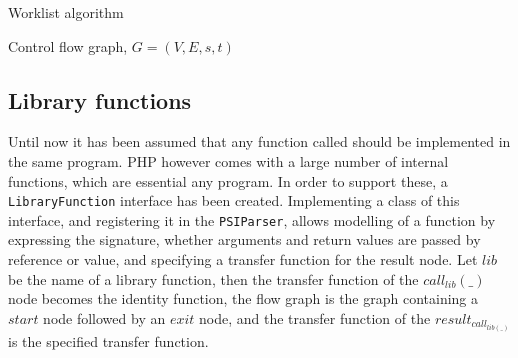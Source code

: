 \begin{algorithm}
\caption{Worklist algorithm}
\label{algo:worklist}
\begin{algorithmic}[1]
\scriptsize
\Require Control flow graph, $G=(V,E,s,t)$
	
		
		
	\EndIf
	
\EndWhile
\end{algorithmic}
\end{algorithm}

\subsection{Library functions}

Until now it has been assumed that any function called should be implemented in the same program. PHP however comes with a large number of internal functions, which are essential any program. In order to support these, a \texttt{LibraryFunction} interface has been created. Implementing a class of this interface, and registering it in the \texttt{PSIParser}, allows modelling of a function by expressing the signature, whether arguments and return values are passed by reference or value, and specifying a transfer function for the result node. Let $\mathit{lib}$ be the name of a library function, then the transfer function of the $\mathit{call}_\mathit{lib}(\_)$ node becomes the identity function, the flow graph is the graph containing a $\mathit{start}$ node followed by an $\mathit{exit}$ node, and the transfer function of the $\mathit{result}_{\mathit{call}_{\mathit{lib}(\_)}}$ is the specified transfer function. 

